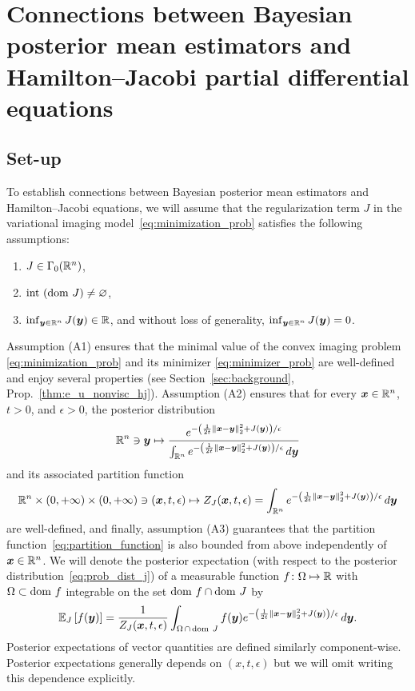 \section{Connections between Bayesian posterior mean estimators and Hamilton--Jacobi partial differential equations}  \label{sec:connections}

\subsection{Set-up} \label{subsec:set-up}
To establish connections between Bayesian posterior mean estimators and Hamilton--Jacobi equations, we will assume that the regularization term $J$ in the variational imaging model~\eqref{eq:minimization_prob} satisfies the following assumptions:
\begin{enumerate}
    \item[(A1)]  $J\in\Gamma_0(\mathbb{R}^n)$,
    \item[(A2)]  $\mathrm{int~}(\mathrm{dom~} J)\neq \varnothing$,
    \item[(A3)]  $\inf_{\boldsymbol{y}\in\mathbb{R}^n}J(\boldsymbol{y}) \in \mathbb{R}$,
and without loss of generality, $\inf_{\boldsymbol{y}\in\mathbb{R}^n}J(\boldsymbol{y})=0$.
\end{enumerate}
Assumption (A1) ensures that the minimal value of the convex imaging problem \eqref{eq:minimization_prob} and its minimizer \eqref{eq:minimizer_prob} are well-defined and enjoy several properties (see Section~\ref{sec:background}, Prop.~\ref{thm:e_u_nonvisc_hj}). Assumption (A2) ensures that for every $\boldsymbol{x} \in \mathbb{R}^n$, $t>0$, and $\epsilon > 0$, the posterior distribution
\begin{equation} \label{eq:prob_dist_j}
    \mathbb{R}^n \ni \boldsymbol{y} \mapsto \frac{e^{-\left(\frac{1}{2t}\left\Vert \boldsymbol{x}-\boldsymbol{y}\right\Vert _{2}^{2}+J(\boldsymbol{y})\right)/\epsilon}}{\int_{\mathbb{R}^n}e^{-\left(\frac{1}{2t}\left\Vert \boldsymbol{x}-\boldsymbol{y}\right\Vert _{2}^{2}+J(\boldsymbol{y})\right)/\epsilon}\mathop{}\!d\boldsymbol{y}}
\end{equation}
and its associated partition function
\begin{equation} \label{eq:partition_function}
\mathbb{R}^n\times(0,+\infty)\times(0,+\infty)\ni(\boldsymbol{x},t,\epsilon)\mapsto Z_{J}(\boldsymbol{x},t,\epsilon)=\int_{\mathbb{R}^n}e^{-\left(\frac{1}{2t}\left\Vert \boldsymbol{x}-\boldsymbol{y}\right\Vert _{2}^{2}+J(\boldsymbol{y})\right)/\epsilon}\mathop{}\!d\boldsymbol{y}
\end{equation}
are well-defined, and finally, assumption (A3) guarantees that the partition function~\eqref{eq:partition_function} is also bounded from above independently of $\boldsymbol{x} \in \mathbb{R}^n$. We will denote the posterior expectation (with respect to the posterior distribution~\eqref{eq:prob_dist_j}) of a measurable function $f\colon\Omega\mapsto\mathbb{R}$ with $\Omega\subset\mathrm{dom~} f$ integrable on the set $\mathrm{dom~} f \cap \mathrm{dom~} J$ by
\begin{equation} \label{eq:expectation}
\mathbb{E}_{J}\left [{f(\boldsymbol{y})}\right]=\frac{1}{Z_J(\boldsymbol{x},t,\epsilon)}\int_{\Omega \, \cap\, \mathrm{dom~} J}f(\boldsymbol{y})e^{-\left(\frac{1}{2t}\left\Vert \boldsymbol{x}-\boldsymbol{y}\right\Vert _{2}^{2}+J(\boldsymbol{y})\right)/\epsilon}\mathop{}\!d\boldsymbol{y}.
\end{equation}
Posterior expectations of vector quantities are defined similarly component-wise. Posterior expectations generally depends on $(x,t,\epsilon)$ but we will omit writing this dependence explicitly.

